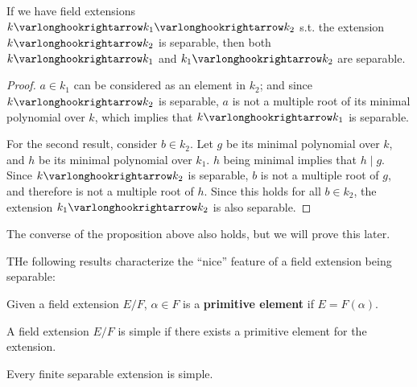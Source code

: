 \documentclass{article}
\begin{document}
\begin{proposition}\label{prop: transitivity of separable extensions, backwards}
    If we have field extensions $k \ext k_1 \ext k_2$ s.t. the extension $k \ext k_2$ is separable, then both $k \ext k_1$ and $k_1 \ext k_2$ are separable. 
\end{proposition}

\begin{proof}
    $a \in k_1$ can be considered as an element in $k_2$; and since $k \ext k_2$ is separable, $a$ is not a multiple root of its minimal polynomial over $k$, which implies that $k \ext k_1$ is separable. 

    For the second result, consider $b \in k_2$. Let $g$ be its minimal polynomial over $k$, and $h$ be its minimal polynomial over $k_1$. $h$ being minimal implies that $h \mid g$. Since $k \ext k_2$ is separable, $b$ is not a multiple root of $g$, and therefore is not a multiple root of $h$. Since this holds for all $b \in k_2$, the extension $k_1 \ext k_2$ is also separable.
\end{proof}

\textstart
The converse of the proposition above also holds, but we will prove this later.

THe following results characterize the ``nice'' feature of a field extension being separable:

\begin{definition}
    Given a field extension $E/F$, $\alpha \in F$ is a \textbf{primitive element} if $E = F(\alpha)$.
\end{definition}
\nogap
\begin{definition}
    A field extension $E/F$ is simple if there exists a primitive element for the extension.
\end{definition}

\begin{theorem}\label{thm: primitive element theorem}
    Every finite separable extension is simple. 
\end{theorem}
\end{document}
